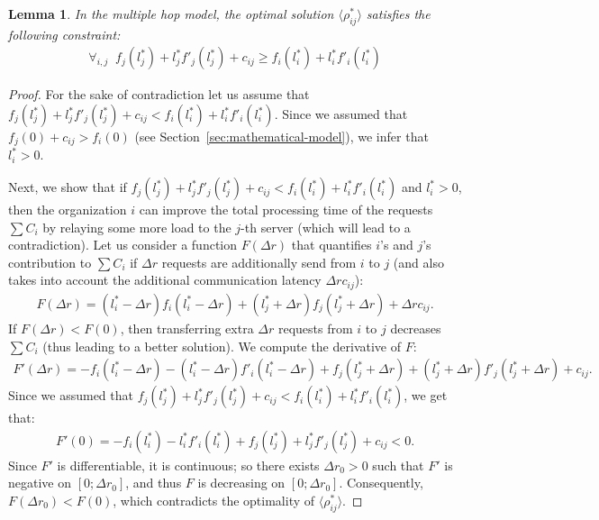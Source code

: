 \documentclass[11pt]{article}
\newtheorem{lemma}[theorem]{Lemma}
\begin{document}
\begin{lemma}\label{lemma:linProg2}
In the multiple hop model, the optimal solution $\langle \rho_{ij}^{*} \rangle$ satisfies the following constraint:
\begin{align}
\forall_{i, j} \; \; f_{j}(l^{*}_j) + l^{*}_jf'_{j}(l^{*}_j) + c_{ij} \geq f_{i}(l^{*}_i) + l^{*}_if'_{i}(l^{*}_i) \label{in:linProgram3}
\end{align}
\end{lemma}
\begin{proof}
For the sake of contradiction let us assume that $f_{j}(l^{*}_j) + l^{*}_jf'_{j}(l^{*}_j) + c_{ij} < f_{i}(l^{*}_i) + l^{*}_if'_{i}(l^{*}_i)$. Since we assumed that $f_{j}(0) + c_{ij} > f_{i}(0)$ (see Section~\ref{sec:mathematical-model}), we infer that $l^{*}_i > 0$.

Next, we show that if $f_{j}(l^{*}_j) + l^{*}_jf'_{j}(l^{*}_j) + c_{ij} <  f_{i}(l^{*}_i) + l^{*}_if'_{i}(l^{*}_i)$ and $l^{*}_i > 0$, then the organization $i$ can improve the total processing time of the requests $\sum{C_i}$ by relaying some more load to the $j$-th server (which will lead to a contradiction).
Let us consider a function $F(\Delta r)$ that quantifies $i$'s and $j$'s contribution to $\sum{C_i}$ if $\Delta r$ requests are additionally send from $i$ to $j$ (and also takes into account the additional communication latency $\Delta r c_{ij}$):
\begin{align*}
F(\Delta r) = (l^{*}_i - \Delta r)f_{i}(l^{*}_i - \Delta r) + (l^{*}_j + \Delta r)f_{j}(l^{*}_j + \Delta r) + \Delta r c_{ij} \text{.}
\end{align*}
If $F(\Delta r) < F(0)$, then transferring extra $\Delta r$ requests from $i$ to $j$ decreases $\sum{C_i}$ (thus leading to a better solution). We compute the derivative of $F$:
\begin{align*}
F'(\Delta r) = -f_{i}(l^{*}_i - \Delta r) - (l^{*}_i - \Delta r)f'_{i}(l^{*}_i - \Delta r)  + f_{j}(l^{*}_j + \Delta r) + (l^{*}_j + \Delta r)f'_{j}(l^{*}_j + \Delta r) + c_{ij} \text{.}
\end{align*}
Since we assumed that $f_{j}(l^{*}_j) + l^{*}_jf'_{j}(l^{*}_j) + c_{ij} < f_{i}(l^{*}_i) + l^{*}_if'_{i}(l^{*}_i)$, we get that:
\begin{align*}
F'(0) = -f_{i}(l^{*}_i) - l^{*}_if'_{i}(l^{*}_i)  + f_{j}(l^{*}_j) + l^{*}_jf'_{j}(l^{*}_j) + c_{ij} < 0 \text{.}
\end{align*}
Since $F'$ is differentiable, it is continuous; so there exists $\Delta r_0 > 0$ such that $F'$ is negative on $[0; \Delta r_0]$, and thus $F$ is decreasing on $[0; \Delta r_0]$. Consequently, $F(\Delta r_0) < F(0)$, which contradicts the optimality of $\langle \rho_{ij}^{*} \rangle$.
\end{proof}
\end{document}
